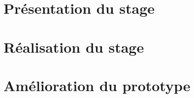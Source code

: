 \documentclass[a4paper,oneside,11pt]{article}
\begin{document}
%


%


\section{Présentation du stage}



\section{Réalisation du stage}


\section{Amélioration du prototype}



%
\end{document}
